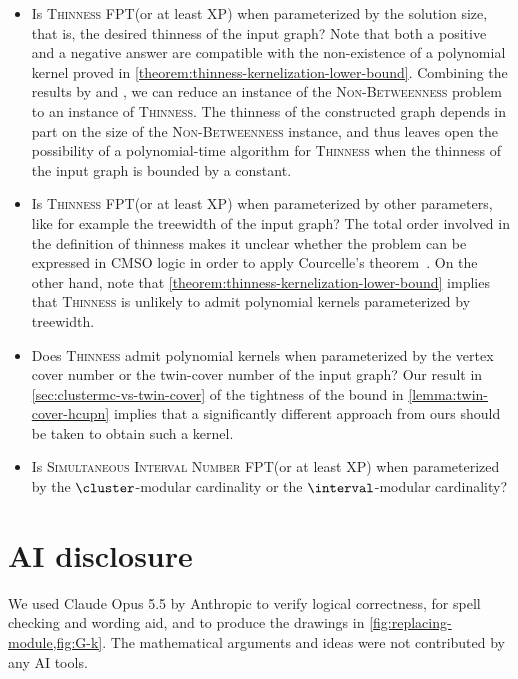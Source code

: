 \documentclass[11pt]{article}
\theoremstyle{plain}
\theoremstyle{definition}
\theoremstyle{remark}
\newcommand{\FPT}{{\smaller[0.83]\textsf{\textup{FPT}}}\xspace}
\begin{document}
\begin{itemize}
    \item Is \textsc{Thinness} \FPT (or at least \textsf{XP}) when parameterized by the solution size, that is, the desired thinness of the input graph? Note that both a positive and a negative answer are compatible with the non-existence of a polynomial kernel proved in \cref{theorem:thinness-kernelization-lower-bound}. Combining the results by \citet{tesis-diego} and \citet{thinness-np-complete}, we can reduce an instance of the \textsc{Non-Betweenness} problem to an instance of \textsc{Thinness}. The thinness of the constructed graph depends in part on the size of the \textsc{Non-Betweenness} instance, and thus leaves open the possibility of a polynomial-time algorithm for \textsc{Thinness} when the thinness of the input graph is bounded by a constant.
    \item Is \textsc{Thinness} \FPT (or at least \textsf{XP}) when parameterized by other parameters, like for example the treewidth of the input graph? The total order involved in the definition of thinness makes it unclear whether the problem can be expressed in {\sf CMSO} logic in order to apply Courcelle's theorem~\citep{Courcelle90}. On the other hand, note that \cref{theorem:thinness-kernelization-lower-bound} implies that \textsc{Thinness} is unlikely to admit polynomial kernels parameterized by treewidth. 
    \item Does \textsc{Thinness} admit polynomial kernels when parameterized by the vertex cover number or the twin-cover number of the input graph? Our result in \cref{sec:clustermc-vs-twin-cover} of the tightness of the bound in \cref{lemma:twin-cover-hcupn} implies that a significantly different approach from ours should be taken to obtain such a kernel.
    \item {Is \textsc{Simultaneous Interval Number}  \FPT (or at least \textsf{XP}) when parameterized by the $\cluster$-modular cardinality or the $\interval$-modular cardinality?}
\end{itemize}

\section{AI disclosure}
We used Claude Opus 5.5 by Anthropic to verify logical correctness, for spell checking and wording aid, and to produce the drawings in \cref{fig:replacing-module,fig:G-k}. The mathematical arguments and ideas were not contributed by any AI tools.
\end{document}
